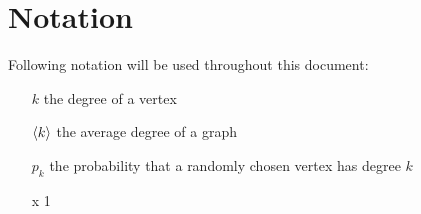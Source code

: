 \chapter*{Notation} %
\label{cha:notation}

Following notation will be used throughout this document:
\begin{itemize}
	\item[$k$] the degree of a vertex
	\item[$\left< k \right>$] the average degree of a graph
	\item[$p_k$] the probability that a randomly chosen vertex has degree $k$
	\item[x] 1 
\end{itemize}
